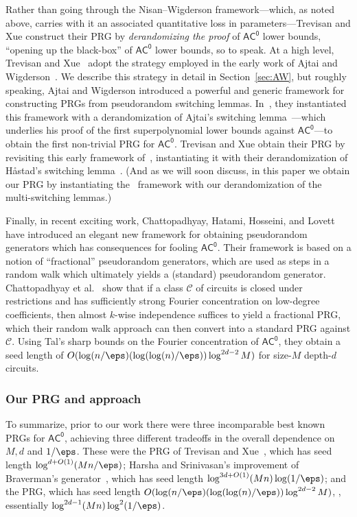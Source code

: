 \documentclass{toc}
\theoremstyle{plain}
\newcommand{\acz}{\mathsf{AC^0}}
\begin{document}
Rather than going through the Nisan--Wigderson framework---which, as noted above, carries with it an associated quantitative loss in parameters---Trevisan and Xue construct their PRG by \emph{derandomizing the proof} of $\acz$ lower bounds, ``opening up the black-box'' of $\acz$ lower bounds, so to speak.  At a high level, Trevisan and Xue~\cite{TX13} adopt the strategy employed in the early work of Ajtai and Wigderson~\cite{AjtaiWigderson:85}. We describe this strategy in detail in Section~\ref{sec:AW}, but roughly speaking, Ajtai and Wigderson introduced a powerful and generic framework for constructing PRGs from pseudorandom switching lemmas. In~\cite{AjtaiWigderson:85}, they instantiated this framework with a derandomization of Ajtai's switching lemma~\cite{ajtai1983}---which underlies his proof of the first superpolynomial lower bounds against $\acz$---to obtain the first non-trivial PRG for $\acz$.  Trevisan and Xue obtain their PRG by revisiting this early framework of~\cite{AjtaiWigderson:85}, instantiating it with their derandomization of H{\aa}stad's switching lemma~\cite{Hastad86}. (And as we will soon discuss, in this
%
paper   %
we obtain our PRG by instantiating the~\cite{AjtaiWigderson:85} framework with our derandomization of the~\cite{Has14} multi-switching lemmas.)
 

 \medskip

Finally, in recent exciting work, %
 Chattopadhyay, Hatami, Hosseini, and Lovett~\cite{CHHL18journal} have
 introduced an elegant new framework for obtaining pseudorandom generators which has consequences for 
fooling $\acz$.  Their framework is based on a notion of ``fractional'' pseudorandom generators, which are used as steps in a random walk which ultimately yields a (standard) pseudorandom generator.  Chattopadhyay et al.~\cite{CHHL18journal} show that if a class
$\mathscr{C}$ %
of %
circuits %
is closed under restrictions and has sufficiently strong Fourier concentration on low-degree coefficients, then almost $k$-wise independence %
suffices  %
to yield a fractional PRG, which their random walk approach can then convert into a standard PRG against $\mathscr{C}$. Using Tal's sharp bounds \cite{Tal:15tightbounds} on the Fourier concentration of $\acz$, they obtain a seed length of $O(\log(n/\eps)(\log(\log(n)/\eps))\log^{2d-2} M)$ for size-$M$ depth-$d$ circuits.



\subsubsection{Our PRG and approach} 
To summarize, prior to our work there were three incomparable best known PRGs for $\acz$, achieving three different tradeoffs in the overall dependence on $M,d$ and $1/\eps$.  These were the PRG of Trevisan and Xue~\cite{TX13}, which has seed length $\log^{d+O(1)}(Mn/\eps)$; Harsha and Srinivasan's improvement of Braverman's generator~\cite{HS16journal}, which has seed length $\log^{3d+O(1)}(Mn)\log(1/\eps)$; and the \cite{CHHL18journal} PRG, which has seed length 
$O(\log(n/\eps)(\log(\log(n)/\eps))\log^{2d-2} M)$, \ie, essentially
$\log^{2d-1}(Mn)\log^2(1/\eps)$.
\end{document}
